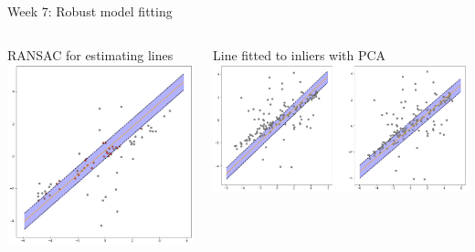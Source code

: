 \documentclass[aspectratio=169,hyperref={pdfpagelabels=false}]{beamer}
\begin{document}
\begin{frame}{ Week 7: Robust model fitting }
	\begin{columns}
		\begin{column}{.45\textwidth}
			\begin{block}{RANSAC for estimating lines}
			\includegraphics[width=\textwidth]{exercise_imgs/ex7-5.png}
			\end{block}
		\end{column}
		\begin{column}{.45\textwidth}
			\begin{block}{Line fitted to inliers with PCA}
			\includegraphics[width=\textwidth]{exercise_imgs/ex7-7.png}
			\end{block}
		\end{column}
	\end{columns}
\end{frame}
\end{document}
